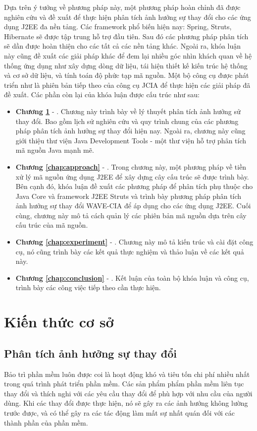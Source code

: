 \documentclass[12pt]{report}
\begin{document}
Dựa trên ý tưởng về phương pháp này, một phương pháp hoàn chỉnh đã được nghiên
cứu và đề xuất để thực hiện phân tích ảnh hưởng sự thay đổi cho các ứng dụng J2EE đa
nền tảng. Các framework phổ biến hiện nay: Spring, Struts, Hibernate sẽ được tập trung
hỗ trợ đầu tiên. Sau đó các phương pháp phân tích sẽ dần được hoàn thiện cho các tất cả các nền tảng khác. Ngoài ra, khóa luận này cũng đề xuất các giải pháp khác để đem lại nhiều góc nhìn
khách quan về hệ thống ứng dụng như xây dựng dòng dữ liệu, tái hiện thiết kế kiến trúc
hệ thống và cơ sở dữ liệu, và tính toán độ phức tạp mã nguồn. Một bộ công cụ được phát
triển như là phiên bản tiếp theo của công cụ JCIA để thực hiện các giải pháp đã đề xuất. Các phần còn lại của khóa luận được cấu trúc như sau:
\begin{itemize}
\item \textbf{Chương \ref{chap:background}} - . Chương này trình bày về lý thuyết phân tích ảnh hưởng sử thay đổi. Bao gồm lịch sử nghiên cứu và quy trình chung của các phương pháp phân tích ảnh hưởng sự thay đổi hiện nay. Ngoài ra, chương này cũng giới thiệu thư viện Java Development Tools - một thư viện hỗ trợ phân tích mã nguồn Java mạnh mẽ.
\item \textbf{Chương \ref{chap:approach}} - . Trong chương này, một phương pháp về tiền xử lý mã nguồn ứng dụng J2EE để xây dựng cây cấu trúc sẽ được trình bày. Bên cạnh đó, khóa luận đề xuất các phương pháp để phân tích phụ thuộc cho Java Core và framework J2EE Struts và trình bày phương pháp phân tích ảnh hưởng sự thay đổi WAVE-CIA để áp dụng cho các ứng dụng J2EE. Cuối cùng, chương này mô tả cách quản lý các phiên bản mã nguồn dựa trên cây cấu trúc của mã nguồn.
\item \textbf{Chương \ref{chap:experiment}} - . Chương này mô tả kiến trúc và cài đặt công cụ, nó cũng trình bày các kết quả thực nghiệm và thảo luận về các kết quả này.
\item \textbf{Chương \ref{chap:conclusion}} - . Kết luận của toàn bộ khóa luận và công cụ, trình bày các công việc tiếp theo cần thực hiện.
\end{itemize}


\newpage	
\chapter{Kiến thức cơ sở}
\label{chap:background}
\section{Phân tích ảnh hưởng sự thay đổi}
Bảo trì phần mềm luôn được coi là hoạt động khó và tiêu tốn chi phí nhiều nhất trong quá trình phát triển phần mềm. Các sản phẩm phẩm phần mềm liên tục thay đổi và thích nghi với các yêu cầu thay đổi để phù hợp với nhu cầu của người dùng. Khi các thay đổi được thực hiện, nó sẽ gây ra các ảnh hướng không lường trước được, và có thể gây ra các tác động làm mất sự nhất quán đối với các thành phần của phần mềm.
\end{document}
